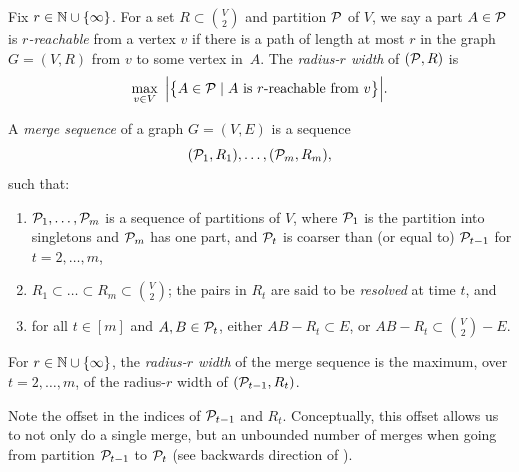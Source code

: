 \medskip



    Fix $r\in\N\cup\set{\infty}$.
        For a set $R\subset {V\choose 2}$ and partition $\cal P$ of $V$,
        we say a part \(A \in \cal P\) is \emph{\(r\)-reachable} from a vertex \(v\) if there is a path of length at most $r$ in the graph $G=(V,R)$ from $v$ to some vertex in~$A$.
        The \emph{radius-$r$ width} of $(\cal P,R)$  is 
        \[
           \max_{v \in V}\ \Big|\bigl\{ A \in \cal P \mid  A \text{ is \(r\)-reachable from } v \bigr\}\Big|.
        \]
        
       


\begin{definition}\label{def:ms}
A \emph{merge sequence} of a graph $G=(V,E)$ 
is a sequence
$$(\cal P_1,R_1),\ldots,(\cal P_m,R_m),$$
  such that:
  \begin{enumerate}
    \item $\cal P_1,\ldots,\cal P_m$ is a sequence of partitions of $V$, 
    where $\cal P_1$ is the partition into singletons and $\cal P_m$ has one part,
    and $\cal P_{t}$ is coarser than (or equal to) $\cal P_{t-1}$ for $t=2,\ldots,m$,
    \item $R_1\subset\ldots\subset R_m\subset {V\choose 2}$; the pairs in $R_t$ are said to be \emph{resolved} at time $t$, and
    \item for all $t\in [m]$ and $A,B\in \cal P_t$,
     either $AB-R_t\subset E$, or $AB-R_t\subset {V\choose 2} - E$.
  \end{enumerate}
For $r\in\N\cup\set{\infty}$, the \emph{radius-$r$ width} of the merge sequence is the maximum, over $t=2,\ldots,m$,
of the radius-$r$ width of $(\cal P_{t-1},R_t)$.
\end{definition}

Note the offset in the indices of $\cal P_{t-1}$ and $R_t$.
Conceptually, this offset allows us to not only do a single merge, but an unbounded number of merges when going from partition \(\cal P_{t-1}\) to \(\cal P_t\) (see backwards direction of ).

